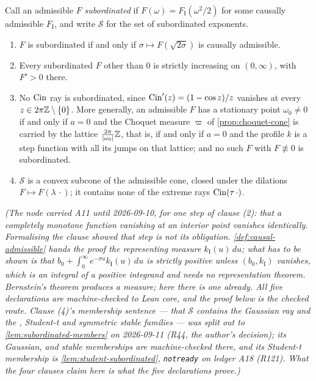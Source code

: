 \begin{proposition}\label{prop:bridge-strictness}
\leanok
{}
Call an admissible $F$ \emph{subordinated} if $F(\omega) = F_{\mathrm I}(\omega^2/2)$ for some
causally admissible $F_{\mathrm I}$, and write $\mathcal{S}$ for the set of subordinated
exponents.
\begin{enumerate}
\item $F$ is subordinated if and only if $\sigma \mapsto F(\sqrt{2\sigma})$ is causally
admissible.
\item Every subordinated $F$ other than $0$ is strictly increasing on $(0,\infty)$, with
$F' > 0$ there.
\item No $\operatorname{Cin}$ ray is subordinated, since $\operatorname{Cin}'(z) = (1 - \cos z)/z$ vanishes at every
$z \in 2\pi\mathbb{Z} \setminus \{0\}$. More generally, an admissible $F$ has a stationary point
$\omega_0 \ne 0$ if and only if $a = 0$ and the Choquet measure $\varpi$ of
\ref{prop:choquet-cone} is carried by the lattice $\tfrac{2\pi}{|\omega_0|}\mathbb{Z}$, that is, if
and only if $a = 0$ and the profile $k$ is a step function with all its jumps on that lattice; and no such
$F$ with $F \not\equiv 0$ is subordinated.
\item $\mathcal{S}$ is a convex subcone of the admissible cone, closed under the dilations
$F \mapsto F(\lambda\,\cdot)$; it contains none of the extreme rays $\operatorname{Cin}(\tau\,\cdot)$.
\end{enumerate}
\statusT\quad\emph{(The node carried A11 until 2026-09-10, for one step of clause (2): that a
completely monotone function vanishing at an interior point vanishes identically. Formalising
the clause showed that step is not its obligation. \ref{def:causal-admissible} \emph{hands} the
proof the representing measure $k_{\mathrm I}(u)\,du$; what has to be shown is that
$b_0 + \int_0^\infty e^{-\sigma u}k_{\mathrm I}(u)\,du$ is strictly positive unless
$(b_0, k_{\mathrm I})$ vanishes, which is an integral of a positive integrand and needs no
representation theorem. Bernstein's theorem produces a measure; here there is one already. All
five declarations are machine-checked to Lean core, and the proof below is the checked route.
Clause (4)'s \emph{membership} sentence --- that $\mathcal{S}$ contains the Gaussian ray and the
\Matern{}, Student-t and symmetric stable families --- was split out to
\ref{lem:subordinated-members} on 2026-09-11 (R44, the author's decision); its Gaussian, \Matern{}
and stable memberships are machine-checked there, and its Student-t membership is
\ref{lem:student-subordinated}, \texttt{notready} on ledger A18 (R121). What the four clauses
claim here is what the five declarations prove.)}
\end{proposition}

